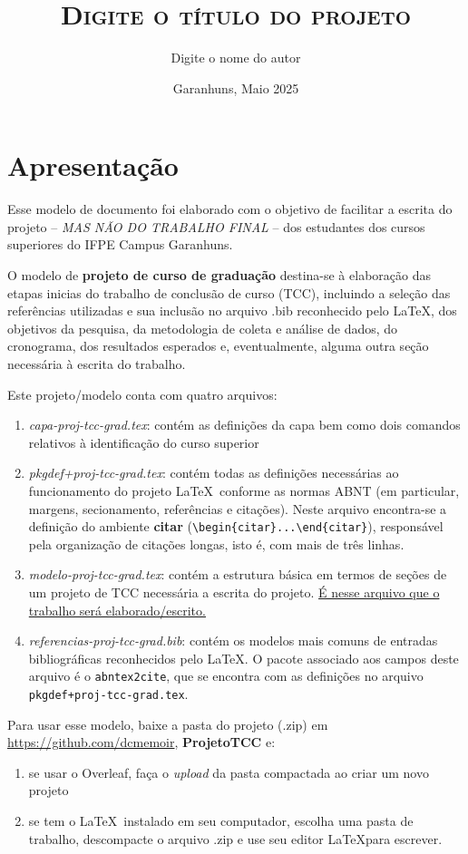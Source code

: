 \documentclass[a4paper,12pt,oneside,extrafontsizes]{memoir}
\title{\textsc{Digite o título do projeto}}%
\author{Digite o nome do autor}
\date{Garanhuns, Maio 2025}
\begin{document}

\newpage\tableofcontents*
\thispagestyle{empty}
\chapter{Apresentação}
Esse modelo de documento foi elaborado com o objetivo de facilitar a escrita do projeto -- \textit{MAS NÃO DO TRABALHO FINAL} -- dos estudantes dos cursos superiores do IFPE Campus Garanhuns.

O modelo de \textbf{projeto de curso de graduação} destina-se à elaboração das etapas inicias do trabalho de conclusão de curso (TCC), incluindo a seleção das referências utilizadas e sua inclusão no arquivo .bib reconhecido pelo \LaTeX, dos objetivos da pesquisa, da metodologia de coleta e análise de dados, do cronograma, dos resultados esperados e, eventualmente, alguma outra seção necessária à escrita do trabalho.

Este projeto/modelo conta com quatro arquivos:
\begin{enumerate}
	\item \textit{capa-proj-tcc-grad.tex}: contém as definições da capa bem como dois comandos relativos à identificação do curso superior
	\item \textit{pkgdef+proj-tcc-grad.tex}: contém todas as definições necessárias ao funcionamento do projeto \LaTeX\ conforme as normas ABNT (em particular, margens, secionamento, referências e citações). Neste arquivo encontra-se a definição do ambiente \textbf{citar} (\verb*|\begin{citar}...\end{citar}|), responsável pela organização de citações longas, isto é, com mais de três linhas.
	\item \textit{modelo-proj-tcc-grad.tex}: contém a estrutura básica em termos de seções de um projeto de TCC necessária a escrita do projeto. \underline{É nesse arquivo que o trabalho será elaborado/escrito.}
	\item \textit{referencias-proj-tcc-grad.bib}: contém os modelos mais comuns de entradas bibliográficas reconhecidos pelo \LaTeX. O pacote associado aos campos deste arquivo é o \verb*|abntex2cite|, que se encontra com as definições no arquivo \verb*|pkgdef+proj-tcc-grad.tex|.
\end{enumerate}

Para usar esse modelo, baixe a pasta do projeto (.zip) em \url{https://github.com/dcmemoir}, \textbf{ProjetoTCC} e:
\begin{enumerate}
	\item se usar o Overleaf, faça o \textit{upload} da pasta compactada ao criar um novo projeto
	\item se tem o \LaTeX\ instalado em seu computador, escolha uma pasta de trabalho, descompacte o arquivo .zip e use seu editor \LaTeX para escrever.
\end{enumerate}
\end{document}
